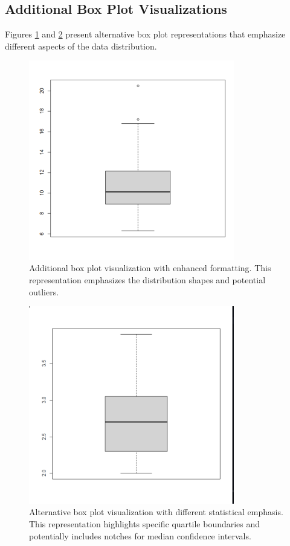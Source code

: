 \documentclass[a4paper,12pt]{article}
\begin{document}
\subsection{Additional Box Plot Visualizations}
\label{subsec:additional_bp}

Figures \ref{fig:ex3} and \ref{fig:ex3-1} present alternative box plot representations that emphasize different aspects of the data distribution.

\begin{figure}[H]
    \centering
    \includegraphics[width=0.8\textwidth]{ex3.png}
    \caption{Additional box plot visualization with enhanced formatting. This representation emphasizes the distribution shapes and potential outliers.}
    \label{fig:ex3}
\end{figure}

\begin{figure}[H]
    \centering
    \includegraphics[width=0.8\textwidth]{ex3-1.png}
    \caption{Alternative box plot visualization with different statistical emphasis. This representation highlights specific quartile boundaries and potentially includes notches for median confidence intervals.}
    \label{fig:ex3-1}
\end{figure}
\end{document}
